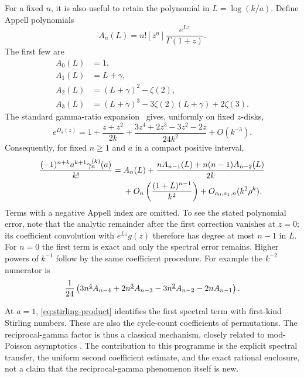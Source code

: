 For a fixed \(n\), it is also useful to retain the polynomial in
\(L=\log(k/a)\). Define Appell polynomials
\[
A_n(L)=n![z^n]\frac{e^{Lz}}{\Gamma(1+z)}.
\]
The first few are
\begin{align*}
A_0(L)&=1,\\
A_1(L)&=L+\gamma,\\
A_2(L)&=(L+\gamma)^2-\zeta(2),\\
A_3(L)&=(L+\gamma)^3-3\zeta(2)(L+\gamma)+2\zeta(3).
\end{align*}
The standard gamma-ratio expansion~\cite{DLMF} gives, uniformly on
fixed \(z\)-disks,
\[
e^{D_k(z)}=
1+\frac{z+z^2}{2k}
 +\frac{3z^4+2z^3-3z^2-2z}{24k^2}+O(k^{-3}).
\]
Consequently, for fixed \(n\ge1\) and \(a\) in a compact positive
interval,
\begin{align}
\frac{(-1)^{n+k}a^{k+1}\gamma_n^{(k)}(a)}{k!}
={}&A_n(L)
 +\frac{nA_{n-1}(L)+n(n-1)A_{n-2}(L)}{2k}\notag\\
&+O_n\left(\frac{(1+L)^{n-1}}{k^2}\right)
 +O_{a_0,a_1,n}(k^2\rho^k).
\label{eq:fixed-index}
\end{align}
Terms with a negative Appell index are omitted.
To see the stated polynomial error, note that the analytic
remainder after the first correction vanishes at \(z=0\);
its coefficient convolution with \(e^{Lz}g(z)\) therefore has
degree at most \(n-1\) in \(L\). For \(n=0\) the first term is
exact and only the spectral error remains.
Higher powers of \(k^{-1}\) follow by the same coefficient procedure.
For example the \(k^{-2}\) numerator is
\[
\frac1{24}\left(
3n^{\underline{4}}A_{n-4}
+2n^{\underline{3}}A_{n-3}
-3n^{\underline{2}}A_{n-2}
-2nA_{n-1}\right).
\]

At \(a=1\), \eqref{eq:stirling-product} identifies the first spectral
term with first-kind Stirling numbers. These are also the cycle-count
coefficients of permutations. The reciprocal-gamma factor is thus a
classical mechanism, closely related to mod-Poisson asymptotics
\cite{KowalskiNikeghbali}. The contribution to this programme is the
explicit spectral transfer, the uniform second coefficient estimate,
and the exact rational enclosure, not a claim that the
reciprocal-gamma phenomenon itself is new.
